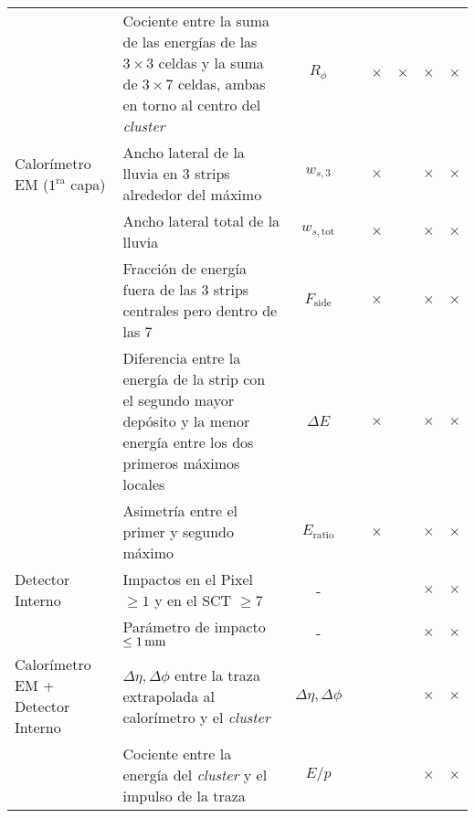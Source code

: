 \begin{table}[!htbp]
\begin{tabular}{y{3cm} p{7cm} c | cc | ccc}
                 & Cociente entre la suma de las energías de las
                   $3\times 3$ celdas y la suma de $3\times 7$
                   celdas, ambas en torno al centro del \emph{cluster}     & $R_\phi$                &   & $\times$ & $\times$ & $\times$ & $\times$ \\


   Calorímetro EM ($1^\mathrm{ra}$ capa) & Ancho lateral de la lluvia en 3 strips alrededor
                  del máximo                                        & $w_{s,3}$               &   & $\times$ &   & $\times$ & $\times$ \\

                & Ancho lateral total de la lluvia                  & $w_{s,\mathrm{tot}}$    &   & $\times$ &   & $\times$ & $\times$ \\

                & Fracción de energía fuera de las 3 strips
                  centrales pero dentro de las 7                    & $F_{\mathrm{side}}$     &   & $\times$ &   & $\times$ & $\times$ \\

                & Diferencia entre la energía de la strip con el
                  segundo mayor depósito y la menor energía entre
                  los dos primeros máximos locales                  & $\Delta E$              &   & $\times$ &   & $\times$ & $\times$ \\

                & Asimetría entre el primer y segundo máximo        & $E_{\mathrm{ratio}}$    &   & $\times$ &   & $\times$ & $\times$ \\


  Detector Interno            & Impactos en el Pixel $\geq 1$ y en el
                  SCT $\geq 7$                                      & -                       &   &   &   & $\times$ & $\times$ \\

                & Parámetro de impacto $\leq \unit[1]{mm}$          & -                       &   &   &   & $\times$ & $\times$ \\


  Calorímetro EM +
  Detector Interno         & $\Delta\eta,\Delta\phi$ entre la traza
                  extrapolada al calorímetro y el \emph{cluster}           & $\Delta\eta,\Delta\phi$ &  &   &   & $\times$ & $\times$ \\

                & Cociente entre la energía del \emph{cluster} y el impulso
                  de la traza                                       & $E/p$                   &  &   &   & $\times$ & $\times$ \\



\end{tabular}
\end{table}
